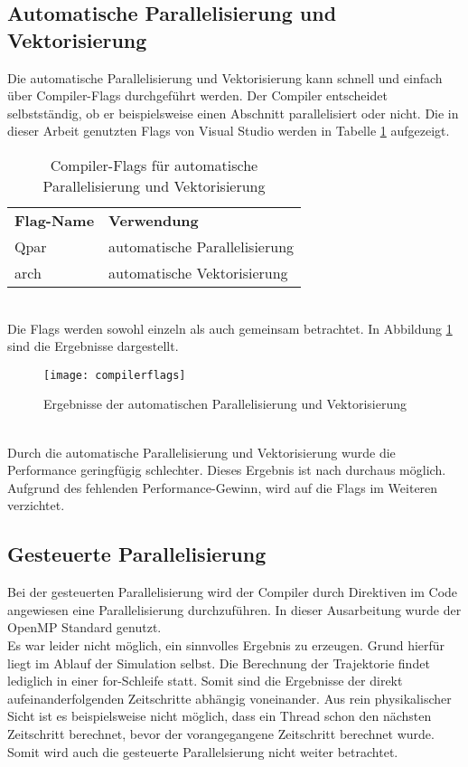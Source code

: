 \subsection{Automatische Parallelisierung und Vektorisierung}
Die automatische Parallelisierung und Vektorisierung kann schnell und einfach über Compiler-Flags durchgeführt werden. Der Compiler entscheidet selbstständig, ob er beispielsweise einen Abschnitt parallelisiert oder nicht. Die in dieser Arbeit genutzten Flags von Visual Studio werden in Tabelle \ref{tab:compilerflags} aufgezeigt. 
\begin{table}[h]
\centering	\begin{tabular}{ll}
		\textbf{Flag-Name} & \textbf{Verwendung}\\
		Qpar & automatische Parallelisierung\\
		arch & automatische Vektorisierung
	\end{tabular}
\caption{Compiler-Flags für automatische Parallelisierung und Vektorisierung}
\label{tab:compilerflags}
\end{table}\noindent\\
Die Flags werden sowohl einzeln als auch gemeinsam betrachtet. In Abbildung \ref{fig:compilerflags} sind die Ergebnisse dargestellt.\newpage
\begin{figure}[h]
	\centering
	\texttt{[image: compilerflags]}
	\caption{Ergebnisse der automatischen Parallelisierung und Vektorisierung}
	\label{fig:compilerflags}
\end{figure}\noindent\\
Durch die automatische Parallelisierung und Vektorisierung wurde die Performance geringfügig schlechter. Dieses Ergebnis ist nach \cite{Kessler.Wintersemester201718} durchaus möglich. Aufgrund des fehlenden Performance-Gewinn, wird auf die Flags im Weiteren verzichtet. 
\subsection{Gesteuerte Parallelisierung}
Bei der gesteuerten Parallelisierung wird der Compiler durch Direktiven im Code angewiesen eine Parallelisierung durchzuführen. In dieser Ausarbeitung wurde der OpenMP Standard genutzt.\\
Es war leider nicht möglich, ein sinnvolles Ergebnis zu erzeugen. Grund hierfür liegt im Ablauf der Simulation selbst. Die Berechnung der Trajektorie findet lediglich in einer for-Schleife statt. Somit sind die Ergebnisse der direkt aufeinanderfolgenden Zeitschritte abhängig voneinander. Aus rein physikalischer Sicht ist es beispielsweise nicht möglich, dass ein Thread schon den nächsten Zeitschritt berechnet, bevor der vorangegangene Zeitschritt berechnet wurde. Somit wird auch die gesteuerte Parallelsierung nicht weiter betrachtet.\\

